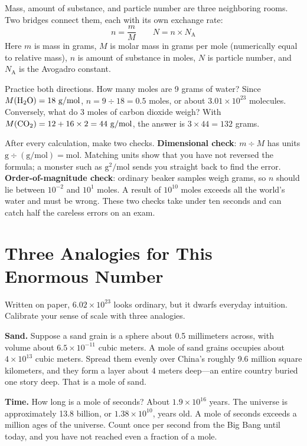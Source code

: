 \begin{qiaoliang}
Mass, amount of substance, and particle number are three neighboring rooms. Two bridges connect them, each with its own exchange rate:
\[
n=\frac{m}{M}\qquad N=n\times N_{\mathrm{A}}
\]
Here $m$ is mass in grams, $M$ is molar mass in grams per mole (numerically equal to relative mass), $n$ is amount of substance in moles, $N$ is particle number, and $N_{\mathrm{A}}$ is the Avogadro constant.

Practice both directions. How many moles are 9 grams of water? Since $M(\mathrm{H_2O})=18\ \mathrm{g/mol}$, $n=9\div 18=0.5$ moles, or about $3.01\times 10^{23}$ molecules. Conversely, what do 3 moles of carbon dioxide weigh? With $M(\chem{CO_2})=12+16\times 2=44\ \mathrm{g/mol}$, the answer is $3\times 44=132$ grams.

After every calculation, make two checks. \textbf{Dimensional check}: $m\div M$ has units $\mathrm{g}\div(\mathrm{g/mol})=\mathrm{mol}$. Matching units show that you have not reversed the formula; a monster such as $\mathrm{g^2/mol}$ sends you straight back to find the error. \textbf{Order-of-magnitude check}: ordinary beaker samples weigh grams, so $n$ should lie between $10^{-2}$ and $10^{1}$ moles. A result of $10^{10}$ moles exceeds all the world's water and must be wrong. These two checks take under ten seconds and can catch half the careless errors on an exam.
\end{qiaoliang}

\section{Three Analogies for This Enormous Number}

Written on paper, $6.02\times 10^{23}$ looks ordinary, but it dwarfs everyday intuition. Calibrate your sense of scale with three analogies.

\textbf{Sand.} Suppose a sand grain is a sphere about 0.5 millimeters across, with volume about $6.5\times 10^{-11}$ cubic meters. A mole of sand grains occupies about $4\times 10^{13}$ cubic meters. Spread them evenly over China's roughly 9.6 million square kilometers, and they form a layer about 4 meters deep---an entire country buried one story deep. That is a mole of sand.

\textbf{Time.} How long is a mole of seconds? About $1.9\times 10^{16}$ years. The universe is approximately 13.8 billion, or $1.38\times 10^{10}$, years old. A mole of seconds exceeds a million ages of the universe. Count once per second from the Big Bang until today, and you have not reached even a fraction of a mole.

